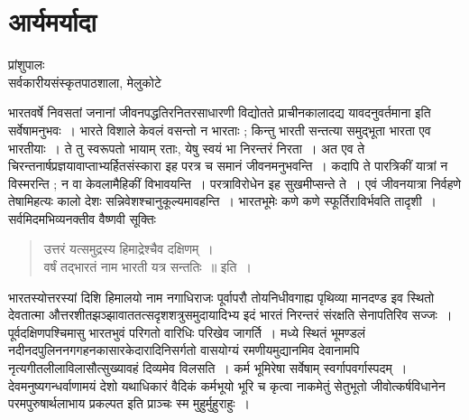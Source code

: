 {\fontsize{15}{17}\selectfont
\presetvalues
\chapter{आर्यमर्यादा}

\begin{center}
\smallskip

प्रांशुपालः\\
सर्वकारीयसंस्कृतपाठशाला, मेलुकोटे
\addrule
\end{center}

भारतवर्षे निवसतां जनानां जीवनपद्धतिरनितरसाधारणी विद्योतते प्राचीनकालादद्य यावदनुवर्तमाना इति सर्वेषामनुभवः~। भारते विशाले केवलं वसन्तो न भारताः ; किन्तु भारती सन्तत्या समुद्भूता भारता एव भारतीयाः~। ते तु स्वरूपतो भायाम् रताः, येषु स्वयं भा निरन्तरं निरता~। अत एव ते चिरन्तनार्षप्रज्ञयावाप्ताभ्यर्हितसंस्कारा इह परत्र च समानं जीवनमनुभवन्ति~। कदापि ते पारत्रिकीं यात्रां न विस्मरन्ति ; न वा केवलामैहिकीं विभावयन्ति~। परत्राविरोधेन इह सुखमीप्सन्ते ते~। एवं जीवनयात्रा निर्वहणे तेषामिहत्यः कालो देशः सन्निवेशश्चानुकूल्यमावहन्ति~। भारतभूमेः कणे कणे स्फूर्तिराविर्भवति तादृशी~। सर्वमिदमभिव्यनक्तीव वैष्णवी सूक्तिः 
\begin{verse}
उत्तरं यत्समुद्रस्य हिमाद्रेश्चैव दक्षिणम्~। \\
वर्षं तद्भारतं नाम भारती यत्र सन्ततिः~॥ इति~। 
\end{verse}
भारतस्योत्तरस्यां दिशि हिमालयो नाम नगाधिराजः पूर्वापरौ तोयनिधीवगाह्य पृथिव्या मानदण्ड इव स्थितो देवतात्मा औत्तरशीतझञ्झावाततत्सदृशशत्रुसमुदायादिभ्य इदं भारतं निरन्तरं संरक्षति सेनापतिरिव सज्जः~। पूर्वदक्षिणपश्चिमासु भारतभुवं परिगतो वारिधिः परिखेव जागर्ति~। मध्ये स्थितं  भूमण्डलं नदीनदपुलिननगगहनकासारकेदारादिनिसर्गतो वासयोग्यं रमणीयमुद्यानमिव देवानामपि नृत्यगीतलीलाविलासौत्सुख्यावहं दिव्यमेव विलसति~। कर्म भूमिरेषा सर्वेषाम् स्वर्गापवर्गास्पदम्~। देवमनुष्यगन्धर्वाणामयं देशो यथाधिकारं वैदिकं कर्मभूयो भूरि च कृत्वा नाकमेतुं सेतुभूतो जीवोत्कर्षविधानेन परमपुरुषार्थलाभाय प्रकल्पत इति प्राञ्चः स्म मुहुर्मुहुराहुः~। 

}
